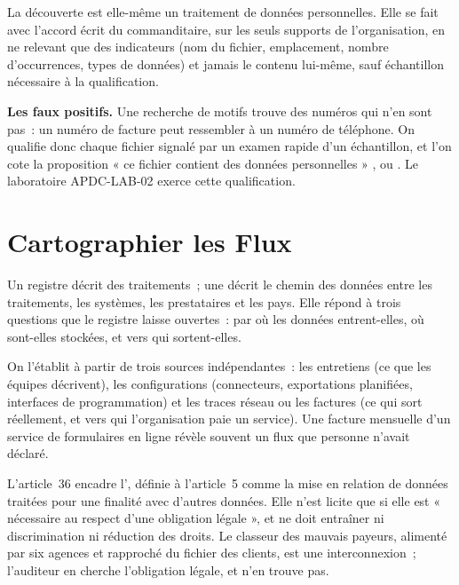 La découverte est elle-même un traitement de données personnelles. Elle se
fait avec l'accord écrit du commanditaire, sur les seuls supports de
l'organisation, en ne relevant que des indicateurs (nom du fichier,
emplacement, nombre d'occurrences, types de données) et jamais le contenu
lui-même, sauf échantillon nécessaire à la qualification.

\begin{boxinfo}
\textbf{Les faux positifs.} Une recherche de motifs trouve des numéros qui
n'en sont pas~: un numéro de facture peut ressembler à un numéro de
téléphone. On qualifie donc chaque fichier signalé par un examen rapide d'un
échantillon, et l'on cote la proposition « ce fichier contient des données
personnelles » \OUI{}, \NON{} ou \NEK{}. Le laboratoire APDC-LAB-02 exerce
cette qualification.
\end{boxinfo}

\section{Cartographier les Flux}
\label{sec:c04-flux}

Un registre décrit des traitements~; une 
décrit le chemin des données entre les traitements, les systèmes, les
prestataires et les pays. Elle répond à trois questions que le registre
laisse ouvertes~: par où les données entrent-elles, où sont-elles stockées,
et vers qui sortent-elles.

On l'établit à partir de trois sources indépendantes~: les entretiens
(ce que les équipes décrivent), les configurations (connecteurs,
exportations planifiées, interfaces de programmation) et les traces
réseau ou les factures (ce qui sort réellement, et vers qui l'organisation
paie un service). Une facture mensuelle d'un service de formulaires en
ligne révèle souvent un flux que personne n'avait déclaré.

L'article~36 encadre l', définie à
l'article~5 comme la mise en relation de données traitées pour une
finalité avec d'autres données. Elle n'est licite que si elle est
« nécessaire au respect d'une obligation légale », et ne doit entraîner ni
discrimination ni réduction des droits. Le classeur des mauvais payeurs,
alimenté par six agences et rapproché du fichier des clients, est une
interconnexion~; l'auditeur en cherche l'obligation légale, et n'en trouve
pas.

